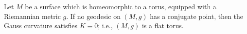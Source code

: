 Let $M$ be a surface which is homeomorphic to a torus, equipped with a Riemannian metric $g$. If no geodesic on $(M, g)$ has a conjugate point, then the Gauss curvature satisfies $K \equiv 0$; i.e., $(M, g)$ is a flat torus.
